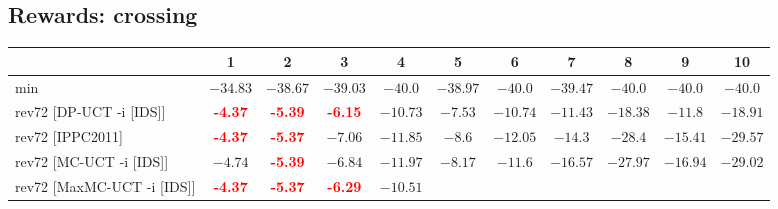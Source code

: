 \documentclass{article}
\begin{document}
\bigskip

\subsection*{Rewards: crossing}

\begin{tabular}{|l|r@{$\pm$}rr@{$\pm$}rr@{$\pm$}rr@{$\pm$}rr@{$\pm$}rr@{$\pm$}rr@{$\pm$}rr@{$\pm$}rr@{$\pm$}rr@{$\pm$}r|}
\hline

& \multicolumn{2}{c}{1}
& \multicolumn{2}{c}{2}
& \multicolumn{2}{c}{3}
& \multicolumn{2}{c}{4}
& \multicolumn{2}{c}{5}
& \multicolumn{2}{c}{6}
& \multicolumn{2}{c}{7}
& \multicolumn{2}{c}{8}
& \multicolumn{2}{c}{9}
& \multicolumn{2}{c|}{10}
\\
\hline
\hline
min
& \multicolumn{2}{c}{$-34.83$}
& \multicolumn{2}{c}{$-38.67$}
& \multicolumn{2}{c}{$-39.03$}
& \multicolumn{2}{c}{$-40.0$}
& \multicolumn{2}{c}{$-38.97$}
& \multicolumn{2}{c}{$-40.0$}
& \multicolumn{2}{c}{$-39.47$}
& \multicolumn{2}{c}{$-40.0$}
& \multicolumn{2}{c}{$-40.0$}
& \multicolumn{2}{c|}{$-40.0$}
\\
rev72 [DP-UCT -i [IDS]]
& \multicolumn{2}{c}{\textbf{\textcolor{red}{-4.37}}}
& \multicolumn{2}{c}{\textbf{\textcolor{red}{-5.39}}}
& \multicolumn{2}{c}{\textbf{\textcolor{red}{-6.15}}}
& \multicolumn{2}{c}{$-10.73$}
& \multicolumn{2}{c}{$-7.53$}
& \multicolumn{2}{c}{$-10.74$}
& \multicolumn{2}{c}{$-11.43$}
& \multicolumn{2}{c}{$-18.38$}
& \multicolumn{2}{c}{$-11.8$}
& \multicolumn{2}{c|}{$-18.91$}
\\
rev72 [IPPC2011]
& \multicolumn{2}{c}{\textbf{\textcolor{red}{-4.37}}}
& \multicolumn{2}{c}{\textbf{\textcolor{red}{-5.37}}}
& \multicolumn{2}{c}{$-7.06$}
& \multicolumn{2}{c}{$-11.85$}
& \multicolumn{2}{c}{$-8.6$}
& \multicolumn{2}{c}{$-12.05$}
& \multicolumn{2}{c}{$-14.3$}
& \multicolumn{2}{c}{$-28.4$}
& \multicolumn{2}{c}{$-15.41$}
& \multicolumn{2}{c|}{$-29.57$}
\\
rev72 [MC-UCT -i [IDS]]
& \multicolumn{2}{c}{$-4.74$}
& \multicolumn{2}{c}{\textbf{\textcolor{red}{-5.39}}}
& \multicolumn{2}{c}{$-6.84$}
& \multicolumn{2}{c}{$-11.97$}
& \multicolumn{2}{c}{$-8.17$}
& \multicolumn{2}{c}{$-11.6$}
& \multicolumn{2}{c}{$-16.57$}
& \multicolumn{2}{c}{$-27.97$}
& \multicolumn{2}{c}{$-16.94$}
& \multicolumn{2}{c|}{$-29.02$}
\\
rev72 [MaxMC-UCT -i [IDS]]
& \multicolumn{2}{c}{\textbf{\textcolor{red}{-4.37}}}
& \multicolumn{2}{c}{\textbf{\textcolor{red}{-5.37}}}
& \multicolumn{2}{c}{\textbf{\textcolor{red}{-6.29}}}
& \multicolumn{2}{c}{$-10.51$}

\end{tabular}
\end{document}
